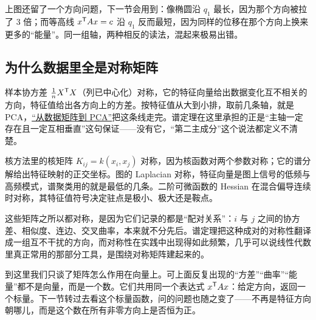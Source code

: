 上图还留了一个方向问题，下一节会用到：像椭圆沿 \(q_1\) 最长，因为那个方向被拉了 3 倍；而等高线 \(x^{\mathsf{T}}Ax=c\) 沿 \(q_1\) 反而最短，因为同样的位移在那个方向上换来更多的``能量''。同一组轴，两种相反的读法，混起来极易出错。

\subsection{为什么数据里全是对称矩阵}

样本协方差 \(\frac1nX^{\mathsf{T}}X\)（列已中心化）对称，它的特征向量给出数据变化互不相关的方向，特征值给出各方向上的方差。按特征值从大到小排，取前几条轴，就是 PCA，\hyperref[sec:03-Linear-Algebra/07-SVD-and-Data-Applications/04]{``从数据矩阵到 PCA''}把这条线走完。谱定理在这里承担的正是``主轴一定存在且一定互相垂直''这句保证——没有它，``第二主成分''这个说法都定义不清楚。

核方法里的核矩阵 \(K_{ij}=k(x_i,x_j)\) 对称，因为核函数对两个参数对称；它的谱分解给出特征映射的正交坐标。图的 Laplacian 对称，特征向量是图上信号的低频与高频模式，谱聚类用的就是最低的几条。二阶可微函数的 Hessian 在混合偏导连续时对称，其特征值符号决定驻点是极小、极大还是鞍点。

这些矩阵之所以都对称，是因为它们记录的都是``配对关系''：\(i\) 与 \(j\) 之间的协方差、相似度、连边、交叉曲率，本来就不分先后。谱定理把这种成对的对称性翻译成一组互不干扰的方向，而对称性在实践中出现得如此频繁，几乎可以说线性代数里真正常用的那部分工具，是围绕对称矩阵建起来的。

到这里我们只谈了矩阵怎么作用在向量上。可上面反复出现的``方差''``曲率''``能量''都不是向量，而是一个数。它们共用同一个表达式 \(x^{\mathsf{T}}Ax\)：给定方向，返回一个标量。下一节转过去看这个标量函数，问的问题也随之变了——不再是特征方向朝哪儿，而是这个数在所有非零方向上是否恒为正。
